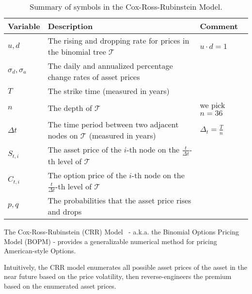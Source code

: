 \renewcommand{\arraystretch}{1.2}
\begin{table}[]
\centering
\caption{Summary of symbols in the Cox-Ross-Rubinstein Model.}
\label{table:summary_symbols_crr}
\footnotesize
\begin{tabular}{|p{1cm}|p{4cm}|p{1.5cm}|}
\hline
Variable             & Description                                                                               & Comment                  \\\hline
$u, d$               & The rising and dropping rate for prices in the binomial tree $\mathcal{T}$                & $u \cdot d = 1$          \\\hline
$\sigma_d, \sigma_a$ & The daily and annualized percentage change rates of asset prices                          &                          \\\hline
$T$                  & The strike time (measured in years)                                                       &                          \\\hline
$n$                  & The depth of $\mathcal{T}$                                                                & we pick $n = 36$         \\\hline
$\Delta t$           & The time period between two adjacent nodes on $\mathcal{T}$ (measured in years)           & $\Delta_t = \frac{T}{n}$ \\\hline
$S_{t, i}$           & The asset price of the $i$-th node on the $\frac{t}{\Delta t}$-th level of $\mathcal{T}$  &                          \\\hline
$C_{t, i}$           & The option price of the $i$-th node on the $\frac{t}{\Delta t}$-th level of $\mathcal{T}$ &                          \\\hline
$p, q$               & The probabilities that the asset price rises and drops                                    &                          \\\hline
\end{tabular}%

\end{table}



The Cox-Ross-Rubinstein (CRR) Model~\cite{cox1979option} - a.k.a. the Binomial Options Pricing Model (BOPM) - provides a generalizable numerical method for pricing American-style Options.

Intuitively, the CRR model enumerates all possible asset prices of the asset in the near future based on the price volatility,
then reverse-engineers the premium based on the enumerated asset prices.

